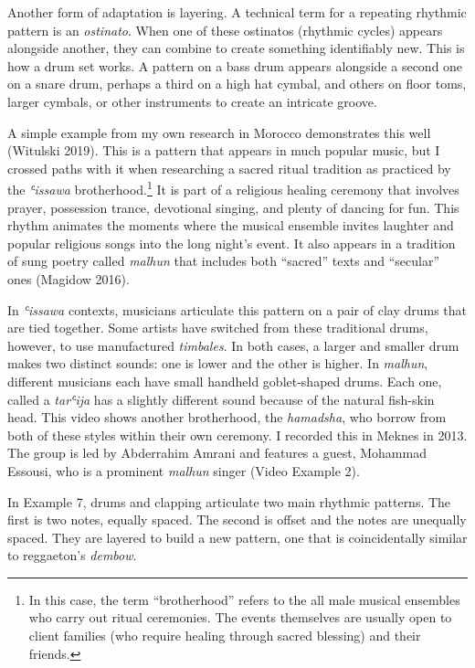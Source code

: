 \documentclass[twoside]{article}
\begin{document}
Another form of adaptation is layering. A technical term for a repeating
rhythmic pattern is an \emph{ostinato}. When one of these ostinatos
(rhythmic cycles) appears alongside another, they can combine to create
something identifiably new. This is how a drum set works. A pattern on a
bass drum appears alongside a second one on a snare drum, perhaps a
third on a high hat cymbal, and others on floor toms, larger cymbals, or
other instruments to create an intricate groove.

A simple example from my own research in Morocco demonstrates this well
(Witulski 2019). This is a pattern that appears in much popular music,
but I crossed paths with it when researching a sacred ritual tradition
as practiced by the \emph{ʿissawa} brotherhood.\footnote{In this case,
  the term ``brotherhood'' refers to the all male musical ensembles who
  carry out ritual ceremonies. The events themselves are usually open to
  client families (who require healing through sacred blessing) and
  their friends.} It is part of a religious healing ceremony that
involves prayer, possession trance, devotional singing, and plenty of
dancing for fun. This rhythm animates the moments where the musical
ensemble invites laughter and popular religious songs into the long
night's event. It also appears in a tradition of sung poetry called
\emph{malhun} that includes both ``sacred'' texts and ``secular'' ones
(Magidow 2016).

In \emph{ʿissawa} contexts, musicians articulate this pattern on a pair
of clay drums that are tied together. Some artists have switched from
these traditional drums, however, to use manufactured \emph{timbales}.
In both cases, a larger and smaller drum makes two distinct sounds: one
is lower and the other is higher. In \emph{malhun}, different musicians
each have small handheld goblet-shaped drums. Each one, called a
\emph{tarʿija} has a slightly different sound because of the natural
fish-skin head. This video shows another brotherhood, the
\emph{hamadsha}, who borrow from both of these styles within their own
ceremony. I recorded this in Meknes in 2013. The group is led by
Abderrahim Amrani and features a guest, Mohammad Essousi, who is a
prominent \emph{malhun} singer (Video Example 2).

In Example 7, drums and clapping articulate two main rhythmic
patterns. The first is two notes, equally spaced. The second is offset
and the notes are unequally spaced. They are layered to build a new
pattern, one that is coincidentally similar to reggaeton's
\emph{dembow}.
\end{document}
